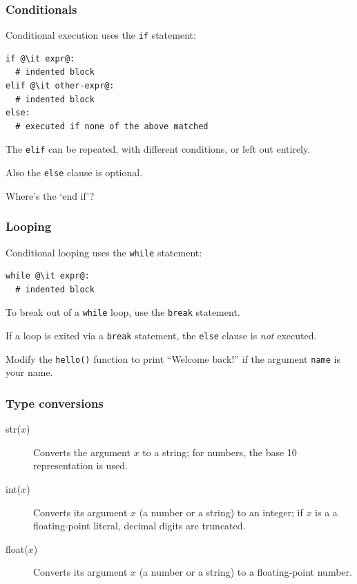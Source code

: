 \documentclass[english,serif,mathserif,xcolor=pdftex,dvipsnames,table]{beamer}
\begin{document}
\begin{frame}[fragile]
  \frametitle{Conditionals}
  Conditional execution uses the \texttt{if} statement:
\begin{lstlisting}
if @\it expr@:
  # indented block
elif @\it other-expr@:
  # indented block
else:
  # executed if none of the above matched
\end{lstlisting}

  \+The \texttt{elif} can be repeated, with different conditions, or
  left out entirely.

  \+
  Also the \texttt{else} clause is optional.

  \+
  \begin{question}
    Where's the `end if'?

  \end{question}
\end{frame}


\begin{frame}[fragile]
  \frametitle{Looping}
  Conditional looping uses the \texttt{while} statement:
\begin{lstlisting}
while @\it expr@:
  # indented block
\end{lstlisting}

  \+
  To break out of a \texttt{while} loop, use the \texttt{break}
  statement.

  \+
  If a loop is exited via a \texttt{break} statement, the
  \texttt{else} clause is \emph{not} executed.

\end{frame}


\begin{frame}
  \begin{exercise}
    Modify the \texttt{hello()} function to print ``Welcome back!'' if
    the argument \texttt{name} is your name.
  \end{exercise}
\end{frame}


\begin{frame}[fragile,label=typeconv]
  \frametitle{Type conversions}
  \begin{description}
  \item[str($x$)] Converts the argument $x$ to a string; for numbers,
    the base 10 representation is used.
  \item[int($x$)] Converts its argument $x$ (a number or a string) to an integer;
    if $x$ is a a floating-point literal, decimal digits are truncated.
  \item[float($x$)] Converts its argument $x$ (a number or a string) to a
    floating-point number.
  \end{description}

  \hyperlink{func1}{}
\end{frame}
\end{document}
